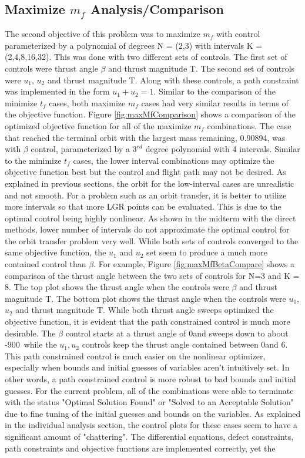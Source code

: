 \documentclass[]{article}
\begin{document}
    \subsection{Maximize \(m_f\) Analysis/Comparison}
   	The second objective of this problem was to maximize \(m_f\) with control parameterized by a polynomial of degrees N = (2,3) with intervals K = (2,4,8,16,32). This was done with two different sets of controls. The first set of controls were thrust angle \(\beta\) and thrust magnitude T. The second set of controls were \(u_1\), \(u_2\) and thrust magnitude T. Along with these controls, a path constraint was implemented in the form \(u_1 + u_2 = 1\). Similar to the comparison of the minimize \(t_f\) cases, both maximize \(m_f\) cases had very similar results in terms of the objective function. Figure \ref{fig:maxMfComparison} shows a comparison of the optimized objective function for all of the maximize \(m_f\) combinations. The case that reached the terminal orbit with the largest mass remaining, 0.90894, was with \(\beta\) control, parameterized by a \(3^{rd}\) degree polynomial with 4 intervals. Similar to the minimize \(t_f\) cases, the lower interval combinations may optimize the objective function best but the control and flight path may not be desired. As explained in previous sections, the orbit for the low-interval cases are unrealistic and not smooth. For a problem such as an orbit transfer, it is better to utilize more intervals so that more LGR points can be evaluated. This is due to the optimal control being highly nonlinear. As shown in the midterm with the direct methods, lower number of intervals do not approximate the optimal control for the orbit transfer problem very well. While both sets of controls converged to the same objective function, the \(u_1\) and \(u_2\) set seem to produce a much more contained control than \(\beta\). For example, Figure \ref{fig:maxMfBetaCompare} shows a comparison of the thrust angle between the two sets of controls for N=3 and K = 8. The top plot shows the thrust angle when the controls were \(\beta\) and thrust magnitude T. The bottom plot shows the thrust angle when the controls were \(u_1\), \(u_2\) and thrust magnitude T. While both thrust angle sweeps optimized the objective function, it is evident that the path constrained control is much more desirable. The \(\beta\) control starts at a thrust angle of 0\degree and sweeps down to about -900\degree\  while the \(u_1, u_2\) controls keep the thrust angle contained between 0\degree  and 6\degree. This path constrained control is much easier on the nonlinear optimizer, especially when bounds and initial guesses of variables aren't intuitively set. In other words, a path constrained control is more robust to bad bounds and initial guesses. For the current problem, all of the combinations were able to terminate with the status "Optimal Solution Found" or "Solved to an Acceptable Solution" due to fine tuning of the initial guesses and bounds on the variables. As explained in the individual analysis section, the control plots for these cases seem to have a significant amount of "chattering". The differential equations, defect constraints, path constraints and objective functions are implemented correctly, yet the 
\end{document}
